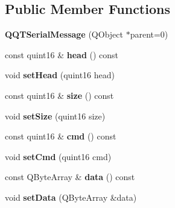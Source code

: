 \subsection*{Public Member Functions}
\begin{DoxyCompactItemize}
\item 
\mbox{\label{class_q_q_t_serial_message_a192b85d6620a8d3b5a02ef2884cbe341}} 
{\bfseries Q\+Q\+T\+Serial\+Message} (Q\+Object $\ast$parent=0)
\item 
\mbox{\label{class_q_q_t_serial_message_a769b4833a95d833e278f9c0e7fd7aa20}} 
const quint16 \& {\bfseries head} () const
\item 
\mbox{\label{class_q_q_t_serial_message_ac633f222bfcb501a0ae02ec1eea0cba4}} 
void {\bfseries set\+Head} (quint16 head)
\item 
\mbox{\label{class_q_q_t_serial_message_a7485a62d92a045e81567eed1335d42c2}} 
const quint16 \& {\bfseries size} () const
\item 
\mbox{\label{class_q_q_t_serial_message_a7fe6e5f6801ff690df503dce268463e3}} 
void {\bfseries set\+Size} (quint16 size)
\item 
\mbox{\label{class_q_q_t_serial_message_a86c4246262309eb94bdf6cd8d6265bca}} 
const quint16 \& {\bfseries cmd} () const
\item 
\mbox{\label{class_q_q_t_serial_message_a3157a1299feadb0cdff4442e959ca350}} 
void {\bfseries set\+Cmd} (quint16 cmd)
\item 
\mbox{\label{class_q_q_t_serial_message_a250a4df976f9e469b6deb9c082af66f9}} 
const Q\+Byte\+Array \& {\bfseries data} () const
\item 
\mbox{\label{class_q_q_t_serial_message_a8adc9ef02441e6109a77aa08112f2635}} 
void {\bfseries set\+Data} (Q\+Byte\+Array \&data)
\item 
\mbox{\label{class_q_q_t_serial_message_a0b6cc7e86ef8bd4106029137b44298dc}} 

\end{DoxyCompactItemize}
